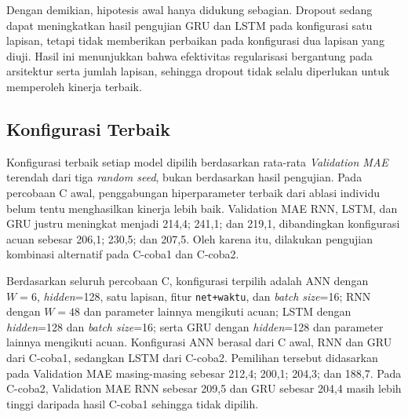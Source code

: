 \documentclass[conference,a4paper]{IEEEtran}
\begin{document}
Dengan demikian, hipotesis awal hanya didukung sebagian. Dropout sedang dapat meningkatkan hasil pengujian GRU dan LSTM pada konfigurasi satu lapisan, tetapi tidak memberikan perbaikan pada konfigurasi dua lapisan yang diuji. Hasil ini menunjukkan bahwa efektivitas regularisasi bergantung pada arsitektur serta jumlah lapisan, sehingga dropout tidak selalu diperlukan untuk memperoleh kinerja terbaik.

\subsection{Konfigurasi Terbaik}
Konfigurasi terbaik setiap model dipilih berdasarkan rata-rata \textit{Validation MAE} terendah dari tiga \textit{random seed}, bukan berdasarkan hasil pengujian. Pada percobaan C awal, penggabungan hiperparameter terbaik dari ablasi individu belum tentu menghasilkan kinerja lebih baik. Validation MAE RNN, LSTM, dan GRU justru meningkat menjadi 214,4; 241,1; dan 219,1, dibandingkan konfigurasi acuan sebesar 206,1; 230,5; dan 207,5. Oleh karena itu, dilakukan pengujian kombinasi alternatif pada C-coba1 dan C-coba2.

Berdasarkan seluruh percobaan C, konfigurasi terpilih adalah ANN dengan $W=6$, \textit{hidden}=128, satu lapisan, fitur \texttt{net+waktu}, dan \textit{batch size}=16; RNN dengan $W=48$ dan parameter lainnya mengikuti acuan; LSTM dengan \textit{hidden}=128 dan \textit{batch size}=16; serta GRU dengan \textit{hidden}=128 dan parameter lainnya mengikuti acuan. Konfigurasi ANN berasal dari C awal, RNN dan GRU dari C-coba1, sedangkan LSTM dari C-coba2. Pemilihan tersebut didasarkan pada Validation MAE masing-masing sebesar 212,4; 200,1; 204,3; dan 188,7. Pada C-coba2, Validation MAE RNN sebesar 209,5 dan GRU sebesar 204,4 masih lebih tinggi daripada hasil C-coba1 sehingga tidak dipilih.
\end{document}
